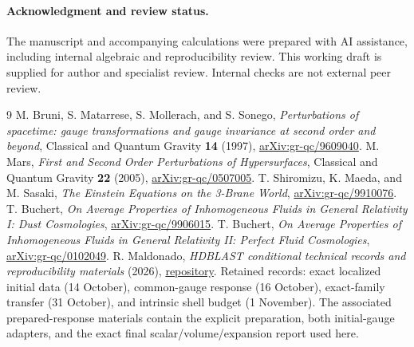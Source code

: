 \documentclass[11pt]{article}
\begin{document}
\paragraph{Acknowledgment and review status.}
The manuscript and accompanying calculations were prepared with AI
assistance, including internal algebraic and reproducibility review.
This working draft is supplied for author and specialist review. Internal
checks are not external peer review.

\begin{thebibliography}{9}
\footnotesize
\setlength{\itemsep}{3pt}
 M. Bruni, S. Matarrese, S. Mollerach, and S. Sonego,
\emph{Perturbations of spacetime: gauge transformations and gauge invariance
at second order and beyond}, Classical and Quantum Gravity \textbf{14}
(1997), \href{https://arxiv.org/abs/gr-qc/9609040}{arXiv:gr-qc/9609040}.
 M. Mars, \emph{First and Second Order Perturbations of
Hypersurfaces}, Classical and Quantum Gravity \textbf{22} (2005),
\href{https://arxiv.org/abs/gr-qc/0507005}{arXiv:gr-qc/0507005}.
 T. Shiromizu, K. Maeda, and M. Sasaki,
\emph{The Einstein Equations on the 3-Brane World},
\href{https://arxiv.org/abs/gr-qc/9910076}{arXiv:gr-qc/9910076}.
 T. Buchert, \emph{On Average Properties of Inhomogeneous
Fluids in General Relativity I: Dust Cosmologies},
\href{https://arxiv.org/abs/gr-qc/9906015}{arXiv:gr-qc/9906015}.
 T. Buchert, \emph{On Average Properties of Inhomogeneous
Fluids in General Relativity II: Perfect Fluid Cosmologies},
\href{https://arxiv.org/abs/gr-qc/0102049}{arXiv:gr-qc/0102049}.
 R. Maldonado, \emph{HDBLAST conditional technical
records and reproducibility materials} (2026),
\href{https://github.com/maldonado-research/HDblast}{repository}.
Retained records: exact localized initial data (14 October), common-gauge
response (16 October), exact-family transfer (31 October), and intrinsic
shell budget (1 November). The associated prepared-response materials
contain the explicit preparation, both initial-gauge adapters, and the
exact final scalar/volume/expansion report used here.
\end{thebibliography}
\end{document}
